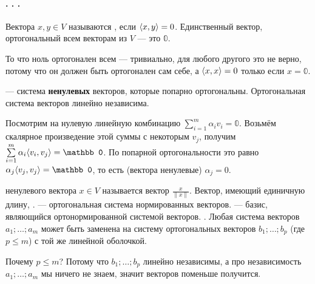 \documentclass{article}
\begin{document}
    \paragraph{. . .}
    \begin{itemize}
        \dfn Вектора $x,y\in V$ называются , если ${\left\langle{x},{y}\right\rangle}=0$.
        \thm Единственный вектор, ортогональный всем векторам из $V$ --- это $\mathbb0$.
        \begin{Proof}
            То что ноль ортогонален всем --- тривиально, для любого другого это не верно, потому что он должен быть ортогонален сам себе, а ${\left\langle{x},{x}\right\rangle}=0$ только если $x=\mathbb0$.
        \end{Proof}
        \dfn {} --- система \textbf{ненулевых} векторов, которые попарно ортогональны.
        \thm Ортогональная система векторов линейно независима.
        \begin{Proof}
            Посмотрим на нулевую линейную комбинацию $\sum\limits_{i=1}^m\alpha_i v_i=\mathbb0$. Возьмём скалярное произведение этой суммы с некоторым $v_j$, получим $\sum\limits_{i=1}^m\alpha_i\dotprod{v_i}{v_j}=\mathbb0$. По попарной ортогональности это равно $\alpha_j\dotprod{v_j}{v_j}=\mathbb0$, то есть (вектора ненулевые) $\alpha_j=0$.
        \end{Proof}
        \dfn {} ненулевого вектора $x\in V$ называется вектор $\frac x{\|x\|}$.
        \dfn Вектор, имеющий единичную длину, .
        \dfn {} --- ортогональная система нормированных векторов.
        \dfn {} --- базис, являющийся ортонормированной системой векторов.
        \thm {}. Любая система векторов $a_1;\ldots;a_m$ может быть заменена на систему ортогональных векторов $b_1;\ldots;b_p$ (где $p\leqslant m$) с той же линейной оболочкой.
        \pagebreak
        \begin{Comment}
            Почему $p\leqslant m$? Потому что $b_1;\ldots;b_p$ линейно независимы, а про независимость $a_1;\ldots;a_m$ мы ничего не знаем, значит векторов поменьше получится.
        \end{Comment}
        \begin{Proof}

\end{Proof}
\end{itemize}
\end{document}
